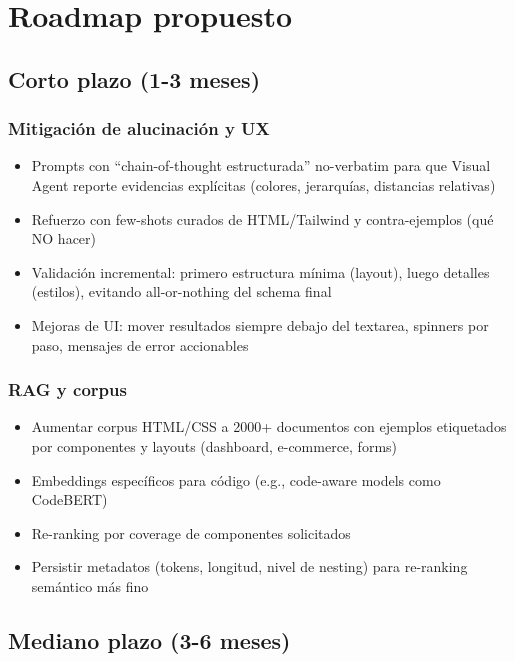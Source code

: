 \documentclass[12pt,a4paper]{article}
\begin{document}
\section{Roadmap propuesto}

\subsection{Corto plazo (1-3 meses)}

\subsubsection{Mitigación de alucinación y UX}

\begin{itemize}
    \item Prompts con ``chain-of-thought estructurada'' no-verbatim para que Visual Agent reporte evidencias explícitas (colores, jerarquías, distancias relativas)
    \item Refuerzo con few-shots curados de HTML/Tailwind y contra-ejemplos (qué NO hacer)
    \item Validación incremental: primero estructura mínima (layout), luego detalles (estilos), evitando all-or-nothing del schema final
    \item Mejoras de UI: mover resultados siempre debajo del textarea, spinners por paso, mensajes de error accionables
\end{itemize}

\subsubsection{RAG y corpus}

\begin{itemize}
    \item Aumentar corpus HTML/CSS a 2000+ documentos con ejemplos etiquetados por componentes y layouts (dashboard, e-commerce, forms)
    \item Embeddings específicos para código (e.g., code-aware models como CodeBERT)
    \item Re-ranking por coverage de componentes solicitados
    \item Persistir metadatos (tokens, longitud, nivel de nesting) para re-ranking semántico más fino
\end{itemize}

\subsection{Mediano plazo (3-6 meses)}
\end{document}
